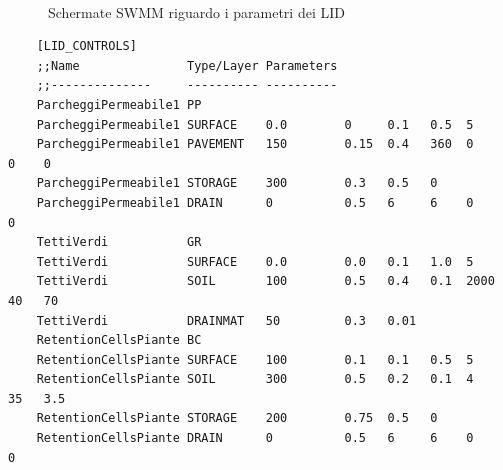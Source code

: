\begin{landscape}
\begin{figure}[H]
    \\
\caption{Schermate SWMM riguardo i parametri dei LID}
\end{figure}
\end{landscape}
\begin{lstlisting}
    [LID_CONTROLS]
    ;;Name               Type/Layer Parameters
    ;;--------------     ---------- ----------
    ParcheggiPermeabile1 PP
    ParcheggiPermeabile1 SURFACE    0.0        0     0.1   0.5  5
    ParcheggiPermeabile1 PAVEMENT   150        0.15  0.4   360  0     0    0
    ParcheggiPermeabile1 STORAGE    300        0.3   0.5   0
    ParcheggiPermeabile1 DRAIN      0          0.5   6     6    0     0
    TettiVerdi           GR
    TettiVerdi           SURFACE    0.0        0.0   0.1   1.0  5
    TettiVerdi           SOIL       100        0.5   0.4   0.1  2000  40   70
    TettiVerdi           DRAINMAT   50         0.3   0.01
    RetentionCellsPiante BC
    RetentionCellsPiante SURFACE    100        0.1   0.1   0.5  5
    RetentionCellsPiante SOIL       300        0.5   0.2   0.1  4     35   3.5
    RetentionCellsPiante STORAGE    200        0.75  0.5   0
    RetentionCellsPiante DRAIN      0          0.5   6     6    0     0
    \end{lstlisting}
